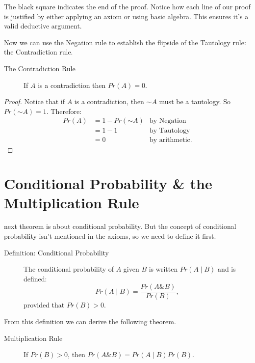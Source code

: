 \documentclass[justified]{tufte-book}
\newcommand{\given}{\mid}
\renewcommand{\neg}{\mathbin{\sim}}
\renewcommand{\wedge}{\mathbin{\&}}
\newcommand{\p}{Pr}
\theoremstyle{definition}
\theoremstyle{definition}
\theoremstyle{definition}
\theoremstyle{remark}
\let\BeginKnitrBlock\begin \let\EndKnitrBlock\end
\begin{document}
The black square indicates the end of the proof. Notice how each line of
our proof is justified by either applying an axiom or using basic
algebra. This ensures it's a valid deductive argument.

Now we can use the Negation rule to establish the flipside of the
Tautology rule: the Contradiction rule.

\begin{description}
\item[The Contradiction Rule]
If \(A\) is a contradiction then \(\p(A) = 0\).
\end{description}

\BeginKnitrBlock{proof}
{} Notice that if \(A\) is a contradiction, then
\(\neg A\) must be a tautology. So \(\p(\neg A) = 1\). Therefore: \[
  \begin{aligned}
  \p(A) &= 1 - \p(\neg A) & \mbox{by Negation}\\
        &= 1 - 1          & \mbox{by Tautology}\\
        &= 0              & \mbox{by arithmetic.}
  \end{aligned}
\]
\EndKnitrBlock{proof}

\hypertarget{conditional-probability-the-multiplication-rule}{%
\section*{Conditional Probability \& the Multiplication
Rule}\label{conditional-probability-the-multiplication-rule}}

 next theorem is about conditional probability. But the
concept of conditional probability isn't mentioned in the axioms, so we
need to define it first.

\begin{description}
\item[Definition: Conditional Probability]
The conditional probability of \(A\) given \(B\) is written
\(\p(A \given B)\) and is defined:
\[\p(A \given B) = \frac{\p(A \wedge B)}{\p(B)},\] provided that
\(\p(B) > 0\).
\end{description}

From this definition we can derive the following theorem.

\begin{description}
\item[Multiplication Rule]
If \(\p(B) > 0\), then \(\p(A \wedge B) = \p(A \given B)\p(B)\).
\end{description}
\end{document}
